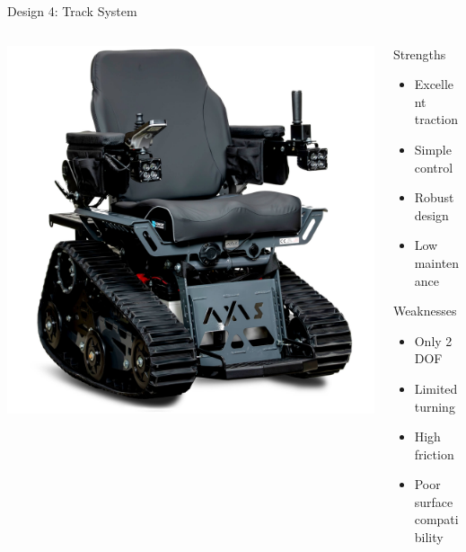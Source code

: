\documentclass[aspectratio=169]{beamer}
\begin{document}
\begin{frame}{Design 4: Track System}
\begin{columns}[c]
\begin{column}{0.5\textwidth}
\includegraphics[height=0.6\textheight]{pdpAssets/TrackBasedSystemwithPivotMechanism.jpg}
\end{column}

\begin{column}{0.48\textwidth}
\begin{block}{Strengths}
\begin{itemize}
    \item Excellent traction
    \item Simple control
    \item Robust design
    \item Low maintenance
\end{itemize}
\end{block}

\begin{block}{Weaknesses}
\begin{itemize}
    \item Only 2 DOF
    \item Limited turning
    \item High friction
    \item Poor surface compatibility
\end{itemize}
\end{block}
\end{column}
\end{columns}
\end{frame}
\end{document}
